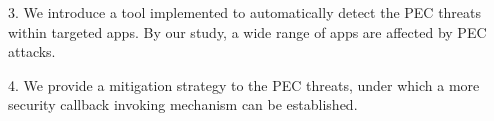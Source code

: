 3. We introduce a tool implemented to automatically detect the PEC threats within targeted apps. By our study, a wide range of apps are affected by PEC attacks.

4. We provide a mitigation strategy to the PEC threats, under which a more security callback invoking mechanism can be established.

